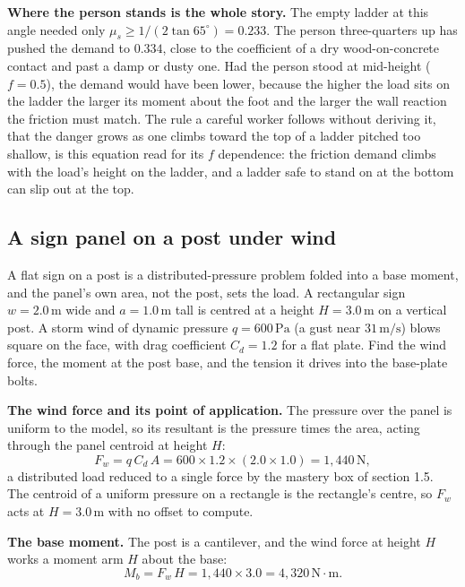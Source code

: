 \textbf{Where the person stands is the whole story.} The empty ladder at this
angle needed only $\mu_s \ge 1/(2\tan 65^{\circ}) = 0.233$. The person
three-quarters up has pushed the demand to $0.334$, close to the coefficient of
a dry wood-on-concrete contact and past a damp or dusty one. Had the person
stood at mid-height ($f = 0.5$), the demand would have been lower, because the
higher the load sits on the ladder the larger its moment about the foot and the
larger the wall reaction the friction must match. The rule a careful worker
follows without deriving it, that the danger grows as one climbs toward the top
of a ladder pitched too shallow, is this equation read for its $f$ dependence:
the friction demand climbs with the load's height on the ladder, and a ladder
safe to stand on at the bottom can slip out at the top.

\subsection{A sign panel on a post under wind}

A flat sign on a post is a distributed-pressure problem folded into a base
moment, and the panel's own area, not the post, sets the load. A rectangular
sign $w = 2.0\,\si{\meter}$ wide and $a = 1.0\,\si{\meter}$ tall is centred at a
height $H = 3.0\,\si{\meter}$ on a vertical post. A storm wind of dynamic
pressure $q = 600\,\text{Pa}$ (a gust near $31\,\text{m/s}$) blows square on the
face, with drag coefficient $C_d = 1.2$ for a flat plate. Find the wind force,
the moment at the post base, and the tension it drives into the base-plate bolts.

\textbf{The wind force and its point of application.} The pressure over the
panel is uniform to the model, so its resultant is the pressure times the area,
acting through the panel centroid at height $H$:
\[
F_w = q\,C_d\,A = 600 \times 1.2 \times (2.0 \times 1.0) = 1{,}440\,\text{N},
\]
a distributed load reduced to a single force by the mastery box of section 1.5.
The centroid of a uniform pressure on a rectangle is the rectangle's centre, so
$F_w$ acts at $H = 3.0\,\si{\meter}$ with no offset to compute.

\textbf{The base moment.} The post is a cantilever, and the wind force at height
$H$ works a moment arm $H$ about the base:
\[
M_b = F_w\,H = 1{,}440 \times 3.0 = 4{,}320\,\text{N}\cdot\text{m}.
\]


